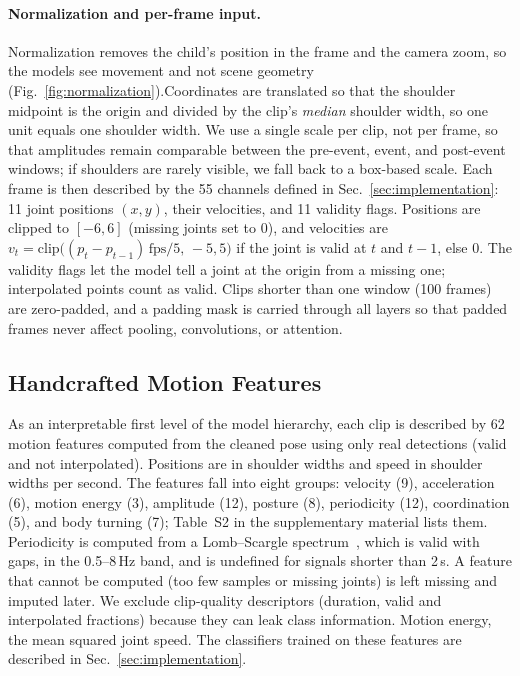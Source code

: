 \documentclass[10pt,twocolumn,letterpaper]{article}
\begin{document}
\paragraph{Normalization and per-frame input.}
Normalization removes the child's position in the frame and the camera zoom, so the models see movement and not scene geometry (Fig.~\ref{fig:normalization}).Coordinates are translated so that the shoulder midpoint is the origin and divided by the clip's \emph{median} shoulder width, so one unit equals one shoulder width. We use a single scale per clip, not per frame, so that amplitudes remain comparable between the pre-event, event, and post-event windows; if shoulders are rarely visible, we fall back to a box-based scale. Each frame is then described by the 55 channels defined in Sec.~\ref{sec:implementation}: 11 joint positions $(x,y)$, their velocities, and 11 validity flags. Positions are clipped to $[-6,6]$ (missing joints set to 0), and velocities are $v_t=\mathrm{clip}\big((p_t-p_{t-1})\,\mathrm{fps}/5,\,-5,5\big)$ if the joint is valid at $t$ and $t{-}1$, else 0. The validity flags let the model tell a joint at the origin from a missing one; interpolated points count as valid. Clips shorter than one window (100 frames) are zero-padded, and a padding mask is carried through all layers so that padded frames never affect pooling, convolutions, or attention.

\subsection{Handcrafted Motion Features}
\label{subsec:handcrafted}
As an interpretable first level of the model hierarchy, each clip is described by 62 motion features computed from the cleaned pose using only real detections (valid and not interpolated). Positions are in shoulder widths and speed in shoulder widths per second. The features fall into eight groups: velocity (9), acceleration (6), motion energy (3), amplitude (12), posture (8), periodicity (12), coordination (5), and body turning (7); Table~S2 in the supplementary material lists them. Periodicity is computed from a Lomb--Scargle spectrum~\cite{...}, which is valid with gaps, in the 0.5--8\,Hz band, and is undefined for signals shorter than 2\,s. A feature that cannot be computed (too few samples or missing joints) is left missing and imputed later. We exclude clip-quality descriptors (duration, valid and interpolated fractions) because they can leak class information. Motion energy, the mean squared joint speed. The classifiers trained on these features are described in Sec.~\ref{sec:implementation}.
\end{document}
